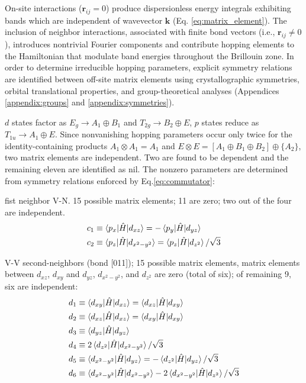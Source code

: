 \documentclass[twocolumn,showpacs,preprintnumbers,superscriptaddress,prb,floatfix,aps,10pt]{revtex4-1}
\renewcommand{\vec}[1]{\ensuremath{\mathbf{#1}}}
\newcommand*{\ham}{\hat{H}}
\begin{document}
On-site interactions ($\vec{r}_{ij} = 0$) produce dispersionless energy integrals exhibiting bands which are independent of wavevector $\vec{k}$ (Eq. \ref{eq:matrix_element}). The inclusion of neighbor interactions, associated with finite bond vectors (i.e., $\vec{r}_{ij} \neq 0$), introduces nontrivial Fourier components and contribute hopping elements to the Hamiltonian that modulate band energies throughout the Brillouin zone. In order to determine irreducible hopping parameters, explicit symmetry relations are identified between off-site matrix elements using crystallographic symmetries, orbital translational properties, and group-theoretical analyses (Appendices \ref{appendix:groups} and \ref{appendix:symmetries}). 













$d$ states factor as $E_g \rightarrow A_1 \oplus B_1$ and $T_{2g} \rightarrow B_2 \oplus E$, $p$ states reduce as $T_{1u} \rightarrow A_1 \oplus E$. Since nonvanishing hopping parameters occur only twice for the identity-containing products $A_1 \otimes A_1 = A_1$ and $E \otimes E = [ A_1 \oplus B_1 \oplus B_2 ] \oplus \{ A_2 \}$, two matrix elements are independent. Two are found to be dependent and the remaining eleven are identified as nil. The nonzero parameters are determined from symmetry relations enforced by Eq.\ref{eq:commutator}:

fist neighbor V-N. 15 possible matrix elements; 11 are zero; two out of the four are independent.
%
\begin{align}
\begin{split}
c_1 & \equiv \braket{p_{x}|\ham|d_{xz}} = -\braket{p_{y}|\ham|d_{yz}} \\
c_2 & \equiv \braket{p_{z}|\ham|d_{x^2-y^2}} = \braket{p_{z}|\ham|d_{z^2}}/\sqrt{3} 
\end{split}
\end{align}

V-V second-neighbors (bond [011]); 15 possible matrix elements, matrix elements between $d_{xz}$, $d_{xy}$ and $d_{yz}$, $d_{x^2-y^2}$, and $d_{z^2}$ are zero (total of six); of remaining 9, six are independent:
%
\begin{align}
\begin{split}
d_1 & \equiv \braket{d_{xy}|\ham|d_{xz}} = \braket{d_{xz}|\ham|d_{xy}} \\
d_2 & \equiv \braket{d_{xz}|\ham|d_{xz}} = \braket{d_{xy}|\ham|d_{xy}} \\
d_3 & \equiv \braket{d_{yz}|\ham|d_{yz}} \\
d_4 & \equiv 2\braket{d_{z^2}|\ham|d_{x^2-y^2}}/\sqrt{3} \\
d_5 & \equiv \braket{d_{x^2-y^2}|\ham|d_{yz}} = -\braket{d_{z^2}|\ham|d_{yz}}/\sqrt{3} \\
d_6 & \equiv \braket{d_{x^2-y^2}|\ham|d_{x^2-y^2}} - 2\braket{d_{x^2-y^2}|\ham|d_{z^2}}/\sqrt{3}
\end{split}
\end{align}
\end{document}
